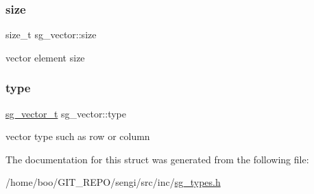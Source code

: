 \subsubsection{\texorpdfstring{size}{size}}
{\footnotesize\ttfamily size\+\_\+t sg\+\_\+vector\+::size}

vector element size \hypertarget{structsg__vector_a924808218863b547191bef97bac6f74c}{}\label{structsg__vector_a924808218863b547191bef97bac6f74c} 
\subsubsection{\texorpdfstring{type}{type}}
{\footnotesize\ttfamily \hyperlink{sg__types_8h_ab9531c9e57e93e82ac67bd83a8eabe2b}{sg\+\_\+vector\+\_\+t} sg\+\_\+vector\+::type}

vector type such as row or column 

The documentation for this struct was generated from the following file\+:\begin{DoxyCompactItemize}
\item 
/home/boo/\+G\+I\+T\+\_\+\+R\+E\+P\+O/sengi/src/inc/\hyperlink{sg__types_8h}{sg\+\_\+types.\+h}\end{DoxyCompactItemize}
